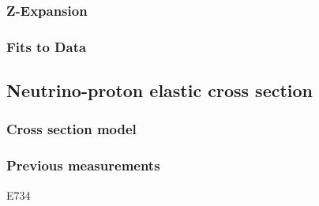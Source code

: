   \subsubsection{Z-Expansion}
  \subsubsection{Fits to Data}

\subsection{Neutrino-proton elastic cross section}\label{sec:probe}
  \subsubsection{Cross section model}

  \subsubsection{Previous measurements}
    E734

